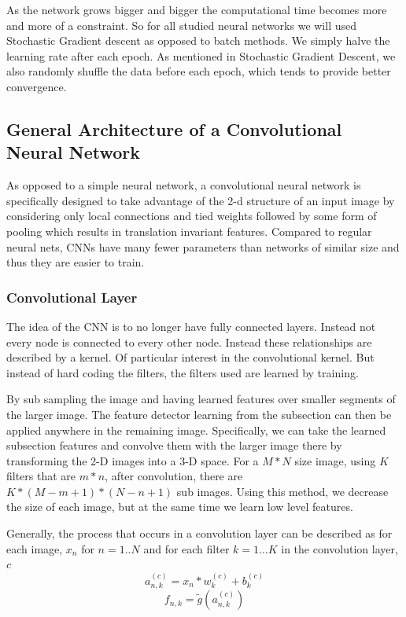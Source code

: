 \documentclass[12pt, twocolumn]{article}
\begin{document}
As the network grows bigger and bigger the computational time becomes more and more of a constraint. So for all studied neural  networks we will used Stochastic Gradient descent as opposed to batch methods. We simply halve the learning rate after each epoch. As mentioned in Stochastic Gradient Descent, we also randomly shuffle the data before each epoch, which tends to provide better convergence.


\subsection{General Architecture of a Convolutional Neural Network}
As opposed to a simple neural network, a convolutional neural network is specifically designed to take advantage of the 2-d structure of an input image by considering only local connections and tied weights followed by some form of pooling which results in translation invariant features. Compared to regular neural nets,  CNNs  have many fewer parameters than networks of similar size and thus they are easier to train.



\subsubsection{Convolutional Layer}
The idea of the CNN is to no longer have fully connected layers. Instead not every node is connected to every other node. Instead these relationships are described by a kernel. Of particular interest in the convolutional kernel. But instead of hard coding the filters, the filters used are learned by training. 

By sub sampling the image and having learned features over smaller segments of the larger image. The feature detector learning from the subsection can then be applied anywhere in the remaining image. Specifically, we can take the learned subsection features and convolve them with the larger image there by  transforming the 2-D images into a 3-D space. For a  $M * N $ size image, using $K$ filters that are $m * n$,  after convolution, there are  $ K * (M - m + 1) * (N - n + 1) $ sub images. Using this method, we decrease the size of each image, but at the same time we learn low level features. 


Generally, the process that occurs in a convolution layer can be described as for each image, $x_n$ for $n=1..N$ and for each filter $k=1...K$ in the convolution layer, $c$
\begin{equation}
a_{n,k}^{(c)}= x_n \ast w_k^{(c)} + b_k^{(c)}
\end{equation}
\begin{equation}
f_{n,k}= \tilde{g}(a_{n,k}^{(c)})
\end{equation}
 
\end{document}
